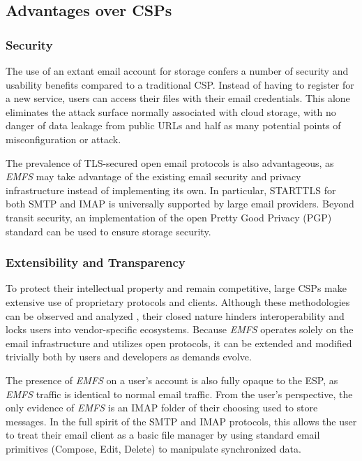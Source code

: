 \documentclass[12pt]{article}
\begin{document}
\subsection{Advantages over CSPs}

\subsubsection{Security}
\label{security}

The use of an extant email account for storage confers a number of security and
usability benefits compared to a traditional CSP. Instead of having to register
for a new service, users can access their files with their email credentials.
This alone eliminates the attack surface normally associated with
cloud storage, with no danger of data leakage from public URLs and half as many
potential points of misconfiguration or attack.

The prevalence of TLS-secured open email protocols is also advantageous,
as \textit{EMFS} may take advantage of the existing email security and privacy
infrastructure instead of implementing its own. In particular, STARTTLS for both
SMTP and IMAP \cite{rfc2487, rfc2595} is universally supported by large email
providers. Beyond transit security, an implementation of the open Pretty
Good Privacy (PGP) standard \cite{rfc4880} can be used to ensure storage
security.

\subsubsection{Extensibility and Transparency}

To protect their intellectual property and remain competitive, large CSPs make
extensive use of proprietary protocols and clients. Although these methodologies
can be observed and analyzed \cite{Drago:2012:IDU:2398776.2398827}, their closed
nature hinders interoperability and locks users into vendor-specific ecosystems.
Because \textit{EMFS} operates solely on the email infrastructure and utilizes
open protocols, it can be extended and modified trivially both by users and
developers as demands evolve.

The presence of \textit{EMFS} on a user's account is also fully opaque to
the ESP, as \textit{EMFS} traffic is identical to normal email traffic.
From the user's perspective, the only evidence of \textit{EMFS} is an IMAP
folder of their choosing used to store messages. In the full spirit of the SMTP
and IMAP protocols, this allows the user to treat their email client as a basic
file manager by using standard email primitives (Compose, Edit, Delete) to
manipulate synchronized data.
\end{document}

